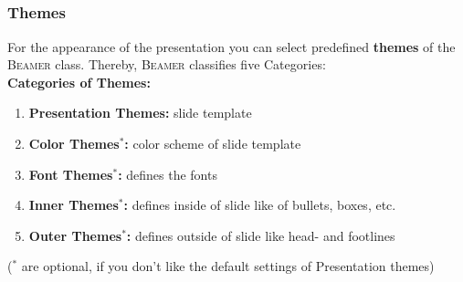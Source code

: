 \documentclass[[newPxFont]{beamer}
\begin{document}
\subsection{}
\begin{frame}[fragile]
  \frametitle{Themes}
  \begin{small}
  For the appearance of the presentation you can select predefined \textbf{themes}
of the {\scshape Beamer} class. Thereby, {\scshape Beamer }classifies five Categories:\\
\vspace{0.67cm}
\textbf{Categories of Themes:}
\begin{enumerate}
  \item \textbf{\color{red}Presentation Themes:} slide template
  \item \textbf{\color{red} Color Themes$^*$:} color scheme of slide template
  \item \textbf{\color{red}  Font Themes$^*$:} defines the fonts
  \item \textbf{\color{red} Inner Themes$^*$:} defines inside of slide like of bullets, boxes, etc.
  \item \textbf{\color{red} Outer Themes$^*$:} defines outside of slide like head- and footlines
\end{enumerate}
($^*$ are optional, if you don’t like the default settings of Presentation themes)
  \end{small}
\end{frame}
\end{document}
